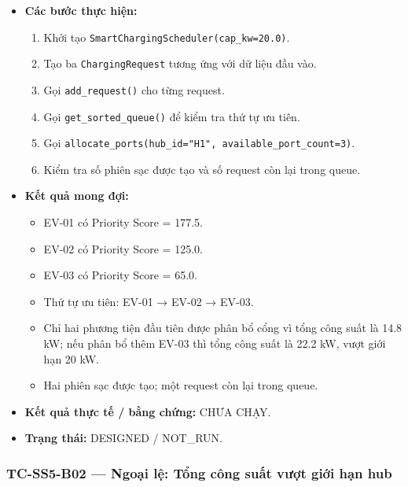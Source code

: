 \documentclass[11pt,a4paper]{article}
\providecommand{\tightlist}{%
  \setlength{\itemsep}{0pt}\setlength{\parskip}{0pt}}
\begin{document}
\begin{itemize}
\tightlist
\item
  \textbf{Các bước thực hiện:}

  \begin{enumerate}
  \def\labelenumi{\arabic{enumi}.}
  \tightlist
  \item
    Khởi tạo \texttt{SmartChargingScheduler(cap\_kw=20.0)}.
  \item
    Tạo ba \texttt{ChargingRequest} tương ứng với dữ liệu đầu vào.
  \item
    Gọi \texttt{add\_request()} cho từng request.
  \item
    Gọi \texttt{get\_sorted\_queue()} để kiểm tra thứ tự ưu tiên.
  \item
    Gọi
    \texttt{allocate\_ports(hub\_id="H1",\ available\_port\_count=3)}.
  \item
    Kiểm tra số phiên sạc được tạo và số request còn lại trong queue.
  \end{enumerate}
\item
  \textbf{Kết quả mong đợi:}

  \begin{itemize}
  \tightlist
  \item
    EV-01 có Priority Score = 177.5.
  \item
    EV-02 có Priority Score = 125.0.
  \item
    EV-03 có Priority Score = 65.0.
  \item
    Thứ tự ưu tiên: EV-01 → EV-02 → EV-03.
  \item
    Chỉ hai phương tiện đầu tiên được phân bổ cổng vì tổng công suất là
    14.8 kW; nếu phân bổ thêm EV-03 thì tổng công suất là 22.2 kW, vượt
    giới hạn 20 kW.
  \item
    Hai phiên sạc được tạo; một request còn lại trong queue.
  \end{itemize}
\item
  \textbf{Kết quả thực tế / bằng chứng:} CHƯA CHẠY.
\item
  \textbf{Trạng thái:} DESIGNED / NOT\_RUN.
\end{itemize}

\hypertarget{tc-ss5-b02-ngoux1ea1i-lux1ec7-tux1ed5ng-cuxf4ng-suux1ea5t-vux1b0ux1ee3t-giux1edbi-hux1ea1n-hub}{%
\subsubsection{TC-SS5-B02 --- Ngoại lệ: Tổng công suất vượt giới hạn
hub}\label{tc-ss5-b02-ngoux1ea1i-lux1ec7-tux1ed5ng-cuxf4ng-suux1ea5t-vux1b0ux1ee3t-giux1edbi-hux1ea1n-hub}}
\end{document}
